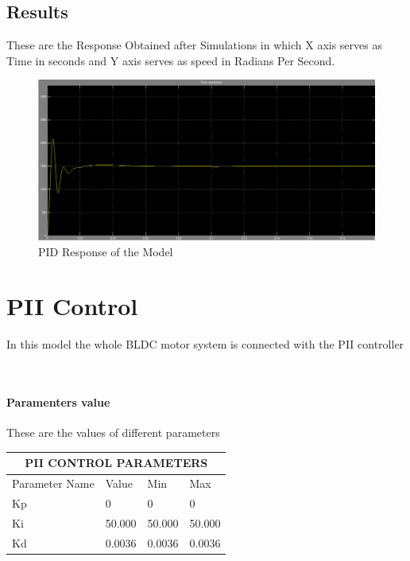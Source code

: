 \documentclass[12pt,openright,twoside]{report}
\begin{document}
\subsection{Results}
These are the Response Obtained after Simulations in which X axis serves as Time in seconds and Y axis serves as speed in Radians Per Second.

\begin{figure}[htbp]
\centerline{\includegraphics[width=\textwidth]{PID Good Quality photo.png}}
\caption{ PID Response of the Model }
\label{ddata}
\end{figure}









\section {PII Control} 
In this model the whole BLDC motor system is connected with the PII controller 


 \\
\paragraph{Paramenters value} These are the values of different parameters 


\vspace{5cm}



\begin{tabular}{ |p{3cm}||p{3cm}|p{3cm}|p{3cm}|  }
\hline
\multicolumn{4}{|c|}{PII CONTROL PARAMETERS} \\
\hline
Parameter Name & Value & Min & Max\\
\hline
Kp  & 0  &0&0\\
Ki&  50.000  & 50.000  &50.000\\
Kd &0.0036& 0.0036&  0.0036\\

\hline
\end{tabular}
\end{document}
